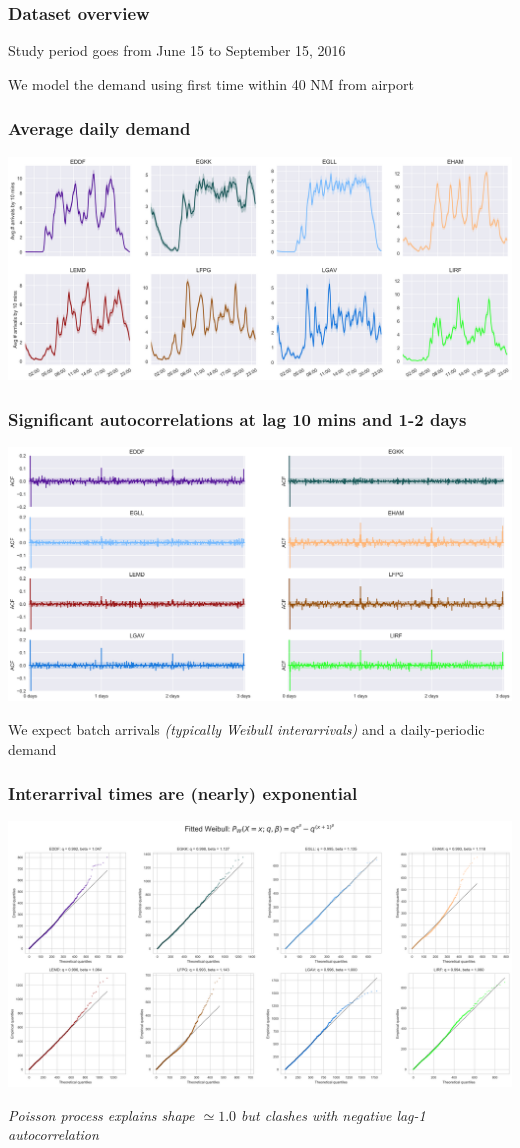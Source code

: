 \documentclass[table,aspectratio=169]{beamer}
\begin{document}
\begin{frame}[t]\frametitle{Dataset overview}
    \centering
    

    \vfill

    \alert{Study period} goes from June 15 to September 15, 2016

    \alert{We model the demand} using first time within 40 NM from airport
\end{frame}

\begin{frame}[t]\frametitle{Average daily demand}
    \centering
    \includegraphics[width=.9\textwidth]{AvgArrivals}
\end{frame}

\begin{frame}[t]\frametitle{Significant autocorrelations at lag 10 mins and 1-2 days}
    \centering
    \includegraphics[width=.7\textwidth]{Autocorr}

    \hfill

    We expect \alert{batch arrivals} \emph{(typically Weibull interarrivals)}
    and a \alert{daily-periodic demand}
\end{frame}

\begin{frame}[t]\frametitle{Interarrival times are (nearly) exponential}
    \centering
    \includegraphics[width=.65\textwidth]{IA_qqplot0800-0930}

    \hfill

    \emph{Poisson process explains shape $\simeq 1.0$
    but clashes with negative lag-1 autocorrelation}
\end{frame}
\end{document}
